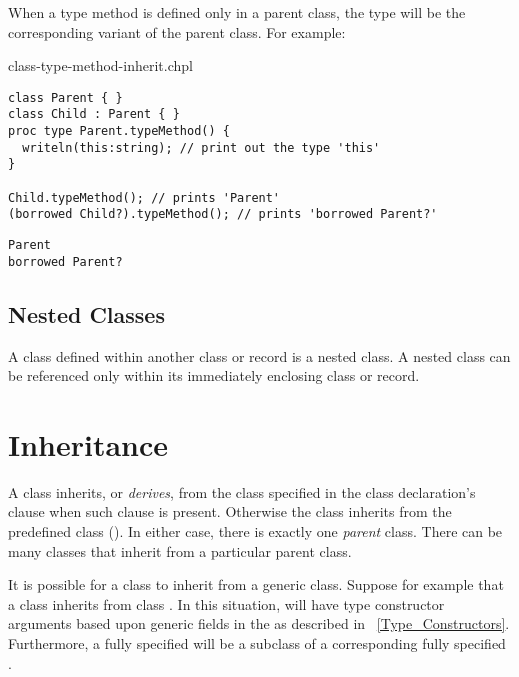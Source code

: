When a type method is defined only in a parent class, the type will be
the corresponding variant of the parent class. For example:

\begin{chapelexample}{class-type-method-inherit.chpl}
\begin{chapel}
\begin{verbatim}
class Parent { }
class Child : Parent { }
proc type Parent.typeMethod() {
  writeln(this:string); // print out the type 'this'
}

Child.typeMethod(); // prints 'Parent'
(borrowed Child?).typeMethod(); // prints 'borrowed Parent?'
\end{verbatim}
\end{chapel}
\begin{chapeloutput}
\begin{verbatim}
Parent
borrowed Parent?
\end{verbatim}
\end{chapeloutput}
\end{chapelexample}


\subsection{Nested Classes}
\label{Nested_Classes}

A class defined within another class or record is a nested class. A nested
class can be referenced only within its immediately enclosing class or record.

\section{Inheritance}
\label{Inheritance}

A class inherits, or \emph{derives}, from the class specified in the class
declaration's  clause when such clause is present.
Otherwise the class inherits from the predefined  class
(). In either case, there is exactly one
\emph{parent} class.
There can be many classes that inherit from a particular parent class.

It is possible for a class to inherit from a generic class. Suppose for
example that a class  inherits from class . In this
situation,  will have type constructor arguments based upon
generic fields in the  as described in
~\ref{Type_Constructors}. Furthermore, a fully specified  will be
a subclass of a corresponding fully specified .

